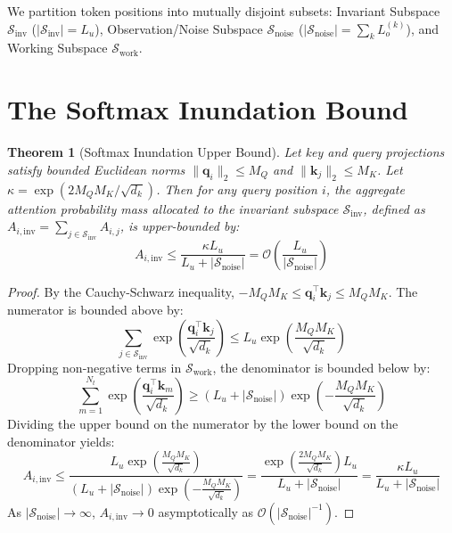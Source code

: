 \documentclass[11pt,a4paper]{article}
\newtheorem{theorem}{Theorem}
\begin{document}
We partition token positions into mutually disjoint subsets: Invariant Subspace $\mathcal{S}_{\text{inv}}$ ($|\mathcal{S}_{\text{inv}}| = L_u$), Observation/Noise Subspace $\mathcal{S}_{\text{noise}}$ ($|\mathcal{S}_{\text{noise}}| = \sum_k L_o^{(k)}$), and Working Subspace $\mathcal{S}_{\text{work}}$.

\section{The Softmax Inundation Bound}
\label{sec:inundation_bound}

\begin{theorem}[Softmax Inundation Upper Bound]
\label{thm:inundation}
Let key and query projections satisfy bounded Euclidean norms $\|\mathbf{q}_i\|_2 \le M_Q$ and $\|\mathbf{k}_j\|_2 \le M_K$. Let $\kappa = \exp(2 M_Q M_K / \sqrt{d_k})$. Then for any query position $i$, the aggregate attention probability mass allocated to the invariant subspace $\mathcal{S}_{\text{inv}}$, defined as $A_{i, \text{inv}} = \sum_{j \in \mathcal{S}_{\text{inv}}} A_{i,j}$, is upper-bounded by:
\begin{equation}
    A_{i, \text{inv}} \le \frac{\kappa L_u}{L_u + |\mathcal{S}_{\text{noise}}|} = \mathcal{O}\left( \frac{L_u}{|\mathcal{S}_{\text{noise}}|} \right)
\end{equation}
\end{theorem}

\begin{proof}
By the Cauchy-Schwarz inequality, $-M_Q M_K \le \mathbf{q}_i^\top \mathbf{k}_j \le M_Q M_K$. The numerator is bounded above by:
\begin{equation}
    \sum_{j \in \mathcal{S}_{\text{inv}}} \exp\left( \frac{\mathbf{q}_i^\top \mathbf{k}_j}{\sqrt{d_k}} \right) \le L_u \exp\left( \frac{M_Q M_K}{\sqrt{d_k}} \right)
\end{equation}
Dropping non-negative terms in $\mathcal{S}_{\text{work}}$, the denominator is bounded below by:
\begin{equation}
    \sum_{m=1}^{N_t} \exp\left( \frac{\mathbf{q}_i^\top \mathbf{k}_m}{\sqrt{d_k}} \right) \ge (L_u + |\mathcal{S}_{\text{noise}}|) \exp\left( -\frac{M_Q M_K}{\sqrt{d_k}} \right)
\end{equation}
Dividing the upper bound on the numerator by the lower bound on the denominator yields:
\begin{equation}
    A_{i, \text{inv}} \le \frac{L_u \exp\left( \frac{M_Q M_K}{\sqrt{d_k}} \right)}{(L_u + |\mathcal{S}_{\text{noise}}|) \exp\left( -\frac{M_Q M_K}{\sqrt{d_k}} \right)} = \frac{\exp\left( \frac{2 M_Q M_K}{\sqrt{d_k}} \right) L_u}{L_u + |\mathcal{S}_{\text{noise}}|} = \frac{\kappa L_u}{L_u + |\mathcal{S}_{\text{noise}}|}
\end{equation}
As $|\mathcal{S}_{\text{noise}}| \to \infty$, $A_{i, \text{inv}} \to 0$ asymptotically as $\mathcal{O}(|\mathcal{S}_{\text{noise}}|^{-1})$.
\end{proof}
\end{document}
